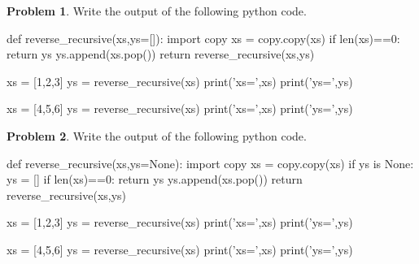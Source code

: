 \documentclass[12pt]{article}
\theoremstyle{definition}
\newtheorem{problem}{Problem}
\begin{document}
\begin{problem}
Write the output of the following python code.
\begin{python}
def reverse_recursive(xs,ys=[]):
    import copy
    xs = copy.copy(xs)
    if len(xs)==0:
        return ys
    ys.append(xs.pop())
    return reverse_recursive(xs,ys)

xs = [1,2,3]
ys = reverse_recursive(xs)
print('xs=',xs)
print('ys=',ys)

xs = [4,5,6]
ys = reverse_recursive(xs)
print('xs=',xs)
print('ys=',ys)
\end{python}
\end{problem}
\vspace{2in}

\newpage

\begin{problem}
Write the output of the following python code.
\begin{python}
def reverse_recursive(xs,ys=None):
    import copy
    xs = copy.copy(xs)
    if ys is None:
        ys = []
    if len(xs)==0:
        return ys
    ys.append(xs.pop())
    return reverse_recursive(xs,ys)

xs = [1,2,3]
ys = reverse_recursive(xs)
print('xs=',xs)
print('ys=',ys)

xs = [4,5,6]
ys = reverse_recursive(xs)
print('xs=',xs)
print('ys=',ys)
\end{python}
\end{problem}
\vspace{2in}
\end{document}
